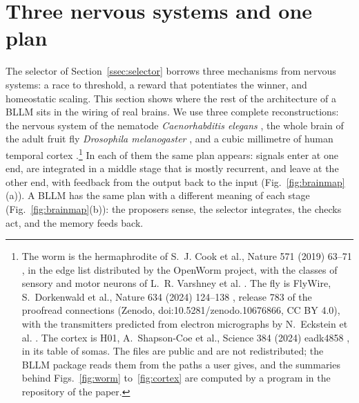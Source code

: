\section{Three nervous systems and one plan}\label{sec:brains}

The selector of Section~\ref{ssec:selector} borrows three mechanisms from nervous systems: a race to threshold, a reward that potentiates the winner, and homeostatic scaling. This section shows where the rest of the architecture of a BLLM sits in the wiring of real brains. We use three complete reconstructions: the nervous system of the nematode \textit{Caenorhabditis elegans} \cite{CJB19}, the whole brain of the adult fruit fly \textit{Drosophila melanogaster} \cite{DMS24b}, and a cubic millimetre of human temporal cortex \cite{SJB24}.\footnote{The worm is the hermaphrodite of S.~J. Cook et al., Nature 571 (2019) 63--71 \cite{CJB19}, in the edge list distributed by the OpenWorm project, with the classes of sensory and motor neurons of L.~R. Varshney et al. \cite{VCP11}. The fly is FlyWire, S.~Dorkenwald et al., Nature 634 (2024) 124--138 \cite{DMS24b}, release 783 of the proofread connections (Zenodo, doi:10.5281/zenodo.10676866, CC BY 4.0), with the transmitters predicted from electron micrographs by N.~Eckstein et al. \cite{EBC24}. The cortex is H01, A.~Shapson-Coe et al., Science 384 (2024) eadk4858 \cite{SJB24}, in its table of somas. The files are public and are not redistributed; the BLLM package reads them from the paths a user gives, and the summaries behind Figs.~\ref{fig:worm} to~\ref{fig:cortex} are computed by a program in the repository of the paper.} In each of them the same plan appears: signals enter at one end, are integrated in a middle stage that is mostly recurrent, and leave at the other end, with feedback from the output back to the input (Fig.~\ref{fig:brainmap}(a)). A BLLM has the same plan with a different meaning of each stage (Fig.~\ref{fig:brainmap}(b)): the proposers sense, the selector integrates, the checks act, and the memory feeds back.

